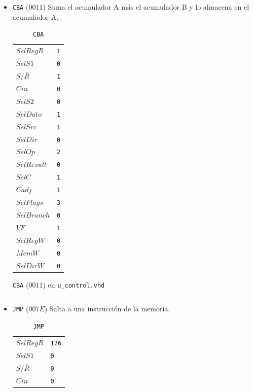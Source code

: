 \documentclass{IEEEtran}
\newenvironment{code}{\captionsetup{type=listing}}{}
\begin{document}
\begin{itemize}
\begin{code}
\caption{\texttt{LDAB} ($00D6$) de acceso directo en \texttt{u\_control.vhd}}
\inputminted[firstline=113, lastline=131]{vhdl}{../Risc/u_control.vhd}
\end{code}
\item \texttt{CBA} (\(0011\))
Suma el acumulador A más el acumulador B y lo almacena en el acumulador A.
\begin{table}[htbp]
\caption{\texttt{CBA}}
\centering
\begin{tabular}{ll}
\hline
\(SelRegR\) & \texttt{1}\\
\(SelS1\) & \texttt{0}\\
\(S/\bar{R}\) & \texttt{1}\\
\(Cin\) & \texttt{0}\\
\(SelS2\) & \texttt{0}\\
\(SelDato\) & \texttt{1}\\
\(SelSrc\) & \texttt{1}\\
\(SelDir\) & \texttt{0}\\
\(SelOp\) & \texttt{2}\\
\(SelResult\) & \texttt{0}\\
\(SelC\) & \texttt{1}\\
\(Cadj\) & \texttt{1}\\
\(SelFlags\) & \texttt{3}\\
\(SelBranch\) & \texttt{0}\\
\(VF\) & \texttt{1}\\
\(SelRegW\) & \texttt{0}\\
\(MemW\) & \texttt{0}\\
\(SelDirW\) & \texttt{0}\\
\hline
\end{tabular}
\end{table}
\begin{code}
\caption{\texttt{CBA} ($0011$) en \texttt{u\_control.vhd}}
\inputminted[firstline=233, lastline=251]{vhdl}{../Risc/u_control.vhd}
\end{code}
\item \texttt{JMP} (\(007E\))
Salta a una instrucción de la memoria.
\begin{table}[htbp]
\caption{\texttt{JMP}}
\centering
\begin{tabular}{ll}
\hline
\(SelRegR\) & \texttt{126}\\
\(SelS1\) & \texttt{0}\\
\(S/\bar{R}\) & \texttt{0}\\
\(Cin\) & \texttt{0}\\

\end{tabular}
\end{table}
\end{itemize}
\end{document}
